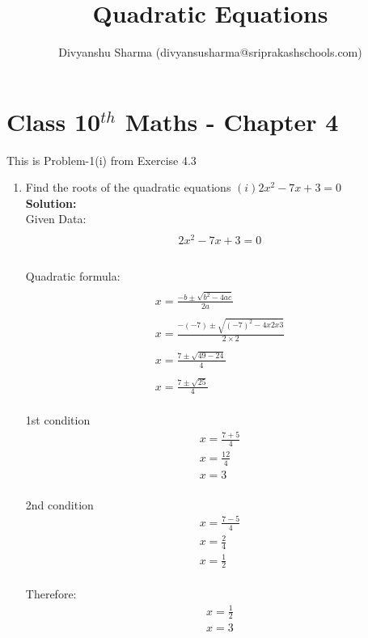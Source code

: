 \documentclass[12pt]{article}
\title{Quadratic Equations}
\author{Divyanshu Sharma (divyansusharma@sriprakashschools.com)}
\newcommand{\solution}{\noindent \textbf{Solution: }}
\begin{document}
\maketitle
\section*{Class 10$^{th}$ Maths - Chapter 4}
This is Problem-1(i) from Exercise 4.3
\begin{enumerate}
\item   Find the roots of the quadratic equations  
$(i)2{x^2} - 7x + 3 = 0$\\
\solution \\
Given Data:
\begin{align*}
\\{2x^2- 7x + 3 = 0}\\
\end{align*}
\\ Quadratic formula:
\begin{align*}
\\{x=\frac{-b\pm\sqrt{b^2-4ac}}{2a}}\\
\\{x=\frac{-(-7)\pm\sqrt{(-7)^2-4x2x3 }}{2 \times 2}}\\
\\{x=\frac{7\pm\sqrt{49 - 24}}{4}}\\
\\{x=\frac{7\pm\sqrt{25}}{4}}\\
\end{align*}

1st condition
\begin{align*}
{x=\frac{7+5}{4}}\\
{x=\frac{12}{4}}\\
{x=3}\\
\end{align*}

2nd condition
\begin{align*}
{x=\frac{7-5}{4}}\\
{x=\frac{2}{4}}\\
{x=\frac{1}{2}}\\
\end{align*}

Therefore:
\begin{align*}
    x=\frac{1}{2}\\
    x= 3
\end{align*}

\end{enumerate}
\end{document}
